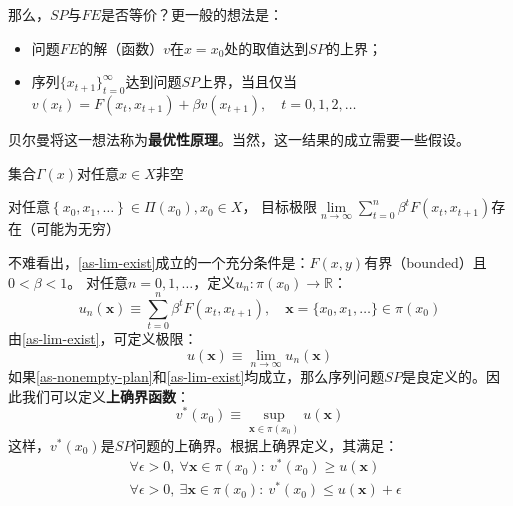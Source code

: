 那么，$SP$与$FE$是否等价？更一般的想法是：
\begin{itemize}
    \item 问题$FE$的解（函数）$v$在$x=x_0$处的取值达到$SP$的上界；
    \item 序列$\{x_{t+1}\}_{t=0}^{\infty}$达到问题$SP$上界，当且仅当
        $v\left(x_t\right)=F\left(x_t, x_{t+1}\right)+\beta v\left(x_{t+1}\right), \quad t=0,1,2, \ldots$
\end{itemize}
贝尔曼将这一想法称为\textbf{最优性原理}。当然，这一结果的成立需要一些假设。
\begin{assumption} \label{as-nonempty-plan}
    集合$\Gamma\left(x\right)$对任意$x\in X$非空
\end{assumption}
\begin{assumption} \label{as-lim-exist}
    对任意$\left\{x_0, x_1, \ldots\right\} \in \Pi\left(x_0\right), x_0 \in X$，
    目标极限$\lim\limits_{n\rightarrow \infty}\sum_{t=0}^{n}\beta^t F\left(x_t,x_{t+1}\right)$存在（可能为无穷）
\end{assumption}
不难看出，\cref{as-lim-exist}成立的一个充分条件是：$F\left(x,y\right)$有界（bounded）且$0<\beta<1$。
对任意$n=0,1,\dots$，定义$u_n: \pi\left(x_0\right)\rightarrow \mathbb{R}$：
$$
u_n(\boldsymbol{x}) \equiv \sum_{t=0}^n \beta^t F\left(x_t, x_{t+1}\right), 
    \quad \boldsymbol{x}=\{x_0,x_1,\dots\} \in \pi\left(x_0\right)
$$
由\cref{as-lim-exist}，可定义极限：
\begin{equation*}
    u\left(\boldsymbol{x}\right) \equiv \lim _{n\rightarrow\infty}u_n\left(\boldsymbol{x}\right)
\end{equation*}
如果\cref{as-nonempty-plan}和\cref{as-lim-exist}均成立，那么序列问题$SP$是良定义的。因此我们可以定义\textbf{上确界函数}：
\begin{equation*}
    v^*\left(x_0\right)\equiv \sup _{\boldsymbol{x}\in\pi\left(x_0\right)} u\left(\boldsymbol{x}\right)
\end{equation*}
这样，$v^*\left(x_0\right)$是$SP$问题的上确界。根据上确界定义，其满足：
\begin{equation*}
    \begin{aligned}
        &\forall \epsilon > 0, ~\forall \boldsymbol{x}\in \pi\left(x_0\right): 
            ~ v^*\left(x_0\right)\geq u\left(\boldsymbol{x}\right) \\
        &\forall \epsilon > 0, ~\exists \boldsymbol{x}\in\pi\left(x_0\right): 
            ~ v^*\left(x_0\right)\leq u\left(\boldsymbol{x}\right)+\epsilon
    \end{aligned}
\end{equation*}

